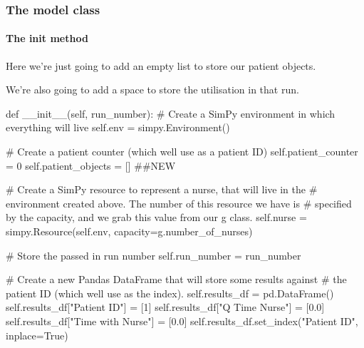 \documentclass[
  letterpaper,
  DIV=11,
  numbers=noendperiod]{scrreprt}
\let\oldparagraph\paragraph
\renewcommand{\paragraph}[1]{\oldparagraph{#1}\mbox{}}
\newenvironment{Shaded}{\begin{snugshade}}{\end{snugshade}}
\newcommand{\CommentTok}[1]{\textcolor[rgb]{0.37,0.37,0.37}{#1}}
\newcommand{\DecValTok}[1]{\textcolor[rgb]{0.68,0.00,0.00}{#1}}
\newcommand{\FloatTok}[1]{\textcolor[rgb]{0.68,0.00,0.00}{#1}}
\newcommand{\FunctionTok}[1]{\textcolor[rgb]{0.28,0.35,0.67}{#1}}
\newcommand{\KeywordTok}[1]{\textcolor[rgb]{0.00,0.23,0.31}{#1}}
\newcommand{\NormalTok}[1]{\textcolor[rgb]{0.00,0.23,0.31}{#1}}
\newcommand{\OperatorTok}[1]{\textcolor[rgb]{0.37,0.37,0.37}{#1}}
\newcommand{\StringTok}[1]{\textcolor[rgb]{0.13,0.47,0.30}{#1}}
\newcommand{\VariableTok}[1]{\textcolor[rgb]{0.07,0.07,0.07}{#1}}
\begin{document}
\subsubsection{The model class}\label{the-model-class-6}

\paragraph{\texorpdfstring{The \textbf{init}
method}{The init method}}\label{the-init-method-6}

Here we're just going to add an empty list to store our patient objects.

We're also going to add a space to store the utilisation in that run.

\begin{Shaded}
\begin{Highlighting}[]
    \KeywordTok{def} \FunctionTok{\_\_init\_\_}\NormalTok{(}\VariableTok{self}\NormalTok{, run\_number):}
        \CommentTok{\# Create a SimPy environment in which everything will live}
        \VariableTok{self}\NormalTok{.env }\OperatorTok{=}\NormalTok{ simpy.Environment()}

        \CommentTok{\# Create a patient counter (which we\textquotesingle{}ll use as a patient ID)}
        \VariableTok{self}\NormalTok{.patient\_counter }\OperatorTok{=} \DecValTok{0}
        \VariableTok{self}\NormalTok{.patient\_objects }\OperatorTok{=}\NormalTok{ [] }\CommentTok{\#\#NEW}

        \CommentTok{\# Create a SimPy resource to represent a nurse, that will live in the}
        \CommentTok{\# environment created above.  The number of this resource we have is}
        \CommentTok{\# specified by the capacity, and we grab this value from our g class.}
        \VariableTok{self}\NormalTok{.nurse }\OperatorTok{=}\NormalTok{ simpy.Resource(}\VariableTok{self}\NormalTok{.env, capacity}\OperatorTok{=}\NormalTok{g.number\_of\_nurses)}

        \CommentTok{\# Store the passed in run number}
        \VariableTok{self}\NormalTok{.run\_number }\OperatorTok{=}\NormalTok{ run\_number}

        \CommentTok{\# Create a new Pandas DataFrame that will store some results against}
        \CommentTok{\# the patient ID (which we\textquotesingle{}ll use as the index).}
        \VariableTok{self}\NormalTok{.results\_df }\OperatorTok{=}\NormalTok{ pd.DataFrame()}
        \VariableTok{self}\NormalTok{.results\_df[}\StringTok{"Patient ID"}\NormalTok{] }\OperatorTok{=}\NormalTok{ [}\DecValTok{1}\NormalTok{]}
        \VariableTok{self}\NormalTok{.results\_df[}\StringTok{"Q Time Nurse"}\NormalTok{] }\OperatorTok{=}\NormalTok{ [}\FloatTok{0.0}\NormalTok{]}
        \VariableTok{self}\NormalTok{.results\_df[}\StringTok{"Time with Nurse"}\NormalTok{] }\OperatorTok{=}\NormalTok{ [}\FloatTok{0.0}\NormalTok{]}
        \VariableTok{self}\NormalTok{.results\_df.set\_index(}\StringTok{"Patient ID"}\NormalTok{, inplace}\OperatorTok{=}\VariableTok{True}\NormalTok{)}


\end{Highlighting}
\end{Shaded}
\end{document}
